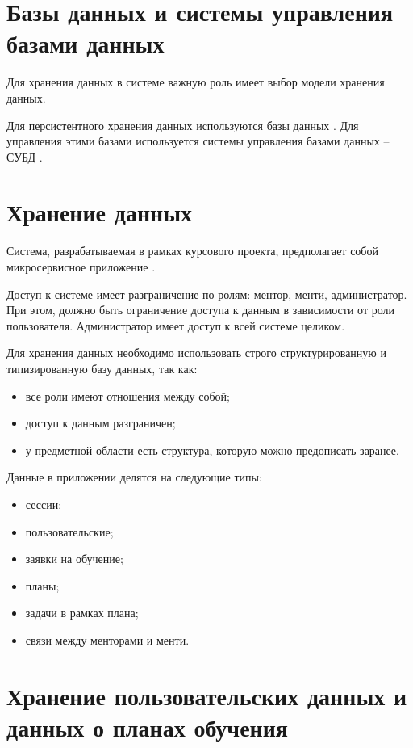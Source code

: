 
\section{Базы данных и системы управления базами данных}

Для хранения данных в системе важную роль имеет выбор модели хранения данных.  

Для персистентного хранения данных используются базы данных \cite{database}.
Для управления этими базами используется системы управления базами данных -- СУБД \cite{subd}.

\section{Хранение данных}

Система, разрабатываемая в рамках курсового проекта, предполагает собой микросервисное приложение \cite{microservice}.

Доступ к системе имеет разграничение по ролям: ментор, менти, администратор. При этом, должно быть ограничение доступа к данным в зависимости от роли пользователя.  
Администратор имеет доступ к всей системе целиком.

Для хранения данных необходимо использовать строго структурированную и типизированную базу данных, так как:
\begin{itemize}
	\item все роли имеют отношения между собой;
	\item доступ к данным разграничен;
	\item у предметной области есть структура, которую можно предописать заранее.  
\end{itemize}

Данные в приложении делятся на следующие типы:
\begin{itemize}
    \item сессии;
    \item пользовательские;
    \item заявки на обучение;
    \item планы;
    \item задачи в рамках плана;
    \item связи между менторами и менти.
\end{itemize}

\section{Хранение пользовательских данных и данных о планах обучения}

